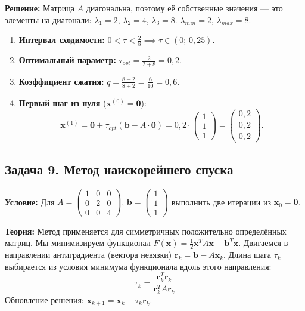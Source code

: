\documentclass{article}
\begin{document}
\textbf{Решение:}
Матрица $A$ диагональна, поэтому её собственные значения — это элементы на диагонали: $\lambda_1 = 2$, $\lambda_2 = 4$, $\lambda_3 = 8$.
$\lambda_{min} = 2$, $\lambda_{max} = 8$.
\begin{enumerate}
    \item \textbf{Интервал сходимости:} $0 < \tau < \frac{2}{8} \implies \tau \in (0;\, 0,25)$.
    \item \textbf{Оптимальный параметр:} $\tau_{opt} = \frac{2}{2 + 8} = 0,2$.
    \item \textbf{Коэффициент сжатия:} $q = \frac{8 - 2}{8 + 2} = \frac{6}{10} = 0,6$.
    \item \textbf{Первый шаг из нуля} ($\textbf{x}^{(0)} = \textbf{0}$):
    $$\textbf{x}^{(1)} = \textbf{0} + \tau_{opt}(\textbf{b} - A\cdot\textbf{0}) = 0,2 \cdot \begin{pmatrix} 1 \\ 1 \\ 1 \end{pmatrix} = \begin{pmatrix} 0,2 \\ 0,2 \\ 0,2 \end{pmatrix}.$$
\end{enumerate}




\subsection*{Задача 9. Метод наискорейшего спуска}
\textbf{Условие:} Для $A = \begin{pmatrix} 1 & 0 & 0 \\ 0 & 2 & 0 \\ 0 & 0 & 4 \end{pmatrix}$, $\textbf{b} = \begin{pmatrix} 1 \\ 1 \\ 1 \end{pmatrix}$ выполнить две итерации из $\textbf{x}_0 = \textbf{0}$.

\textbf{Теория:}
Метод применяется для симметричных положительно определённых матриц. Мы минимизируем функционал $F(\textbf{x}) = \frac{1}{2}\textbf{x}^T A \textbf{x} - \textbf{b}^T\textbf{x}$.
Двигаемся в направлении антиградиента (вектора невязки) $\textbf{r}_k = \textbf{b} - A\textbf{x}_k$.
Длина шага $\tau_k$ выбирается из условия минимума функционала вдоль этого направления:
$$\tau_k = \frac{\textbf{r}_k^T \textbf{r}_k}{\textbf{r}_k^T A \textbf{r}_k}$$
Обновление решения: $\textbf{x}_{k+1} = \textbf{x}_k + \tau_k \textbf{r}_k$.
\end{document}
